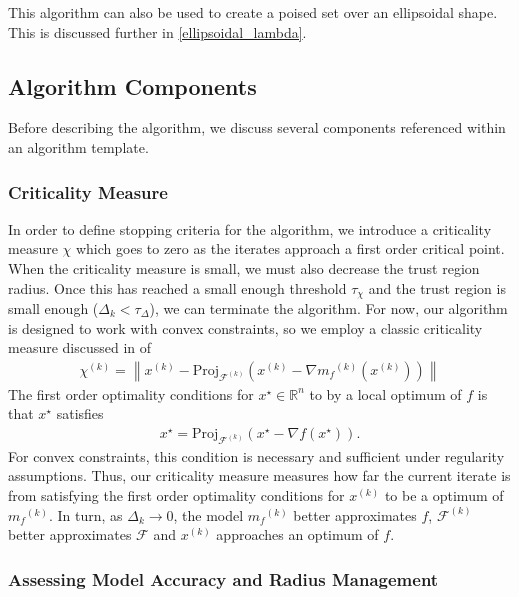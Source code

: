 \documentclass{article}
\theoremstyle{case}
\numberwithin{theorem}{subsection}
\newcommand{\chik}{{\chi^{(k)}}}
\newcommand{\dk}{\Delta_k}
\newcommand{\feasiblek}{{\mathcal F^{(k)}}}
\newcommand{\feasible}{{\mathcal F}}
\newcommand{\gradf}{\nabla f}
\newcommand{\mfk}{{{m}_f}^{(k)}}
\newcommand{\Rn}{\mathbb R^n}
\newcommand{\xk}{{x^{(k)}}}
\begin{document}
This algorithm can also be used to create a poised set over an ellipsoidal shape.
This is discussed further in \cref{ellipsoidal_lambda}.



\subsection{Algorithm Components}

Before describing the algorithm, we discuss several components referenced within an algorithm template.

\subsubsection{Criticality Measure}

In order to define stopping criteria for the algorithm, we introduce a criticality measure $\chi$ which goes to zero as the iterates approach a first order critical point.
When the criticality measure is small, we must also decrease the trust region radius.
Once this has reached a small enough threshold $\tau_{\chi}$ and the trust region is small enough ($\Delta_k < \tau_{\Delta}$), we can terminate the algorithm.
For now, our algorithm is designed to work with convex constraints, so we employ a classic criticality measure discussed in \cite{ConnGoulToin00} of
\begin{align}
\label{define_criticality_measure}
\chik = \left\|\xk - \text{Proj}_{\feasiblek}\left(\xk- \nabla \mfk\left(\xk\right)\right)\right\|
\end{align}
The first order optimality conditions for $x^{\star} \in \Rn$ to by a local optimum of $f$ is that $x^{\star}$ satisfies
\begin{align*}
x^{\star} = \text{Proj}_{\feasiblek}\left(x^{\star} - \gradf(x^{\star})\right).
\end{align*}
For convex constraints, this condition is necessary and sufficient under regularity assumptions.
Thus, our criticality measure measures how far the current iterate is from satisfying the first order optimality conditions for $\xk$ to be a optimum of $\mfk$.
In turn, as $\dk \to 0$, the model $\mfk$ better approximates $f$, $\feasiblek$ better approximates $\feasible$ and $\xk$ approaches an optimum of $f$.

\subsubsection{Assessing Model Accuracy and Radius Management}
\end{document}
